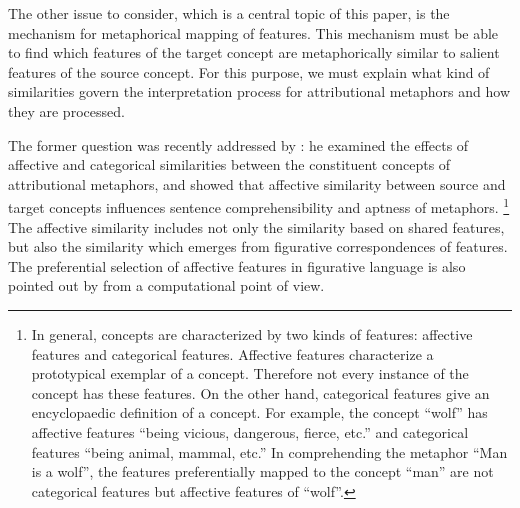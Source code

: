 The other issue to consider, which is a central topic of this paper, is
the mechanism for metaphorical mapping of features. This mechanism must be
able to find which features of the target concept are metaphorically
similar to salient features of the source concept.  For this purpose,
we must explain what kind of similarities govern the interpretation
process for attributional metaphors and how they are processed.

The former question was recently addressed by : he
examined the effects of affective and categorical similarities between
the constituent concepts of attributional metaphors, and showed that
affective similarity between source and target concepts influences
sentence comprehensibility and aptness of metaphors.
\footnote{
  In general, concepts are characterized by two kinds of features:
  affective features and categorical features. Affective features
  characterize a prototypical exemplar of a concept. Therefore not every
  instance of the concept has these features. On the other hand,
  categorical features give an encyclopaedic definition of a
  concept. For example, the concept ``wolf'' has affective features
  ``being vicious, dangerous, fierce, etc.'' and categorical features
  ``being animal, mammal, etc.'' In comprehending the metaphor 
  ``Man is a wolf'', the features preferentially mapped to 
  the concept ``man'' are not categorical features but 
  affective features of ``wolf''.}
The affective similarity includes not only the similarity based on
shared features, but also the similarity which emerges from figurative
correspondences of features.  The preferential selection of affective
features in figurative language
is also pointed out by  from a computational point of view.

